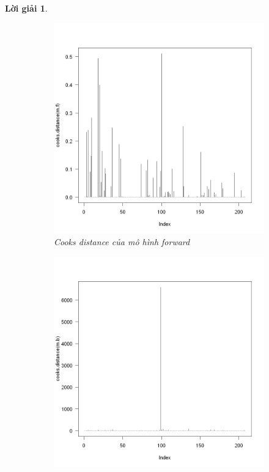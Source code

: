 \documentclass[14pt, a4paper]{article}
\theoremstyle{sltheorem}
\theoremstyle{soltheorem}
\newtheorem*{loigiai}{Lời giải}
\begin{document}
\begin{loigiai}
    \begin{figure}[h!]
        \centering
        \begin{subfigure}[b]{0.4\textwidth}
            \centering
            \includegraphics[width=1.0\textwidth]{figures/mf_cooks.png}
            \caption{Cooks distance của mô hình forward}
        \end{subfigure}
        \hfill
        \begin{subfigure}[b]{0.4\textwidth}
            \centering
            \includegraphics[width=1.0\linewidth]{figures/mb_cooks.png}

\end{subfigure}
\end{figure}
\end{loigiai}
\end{document}
